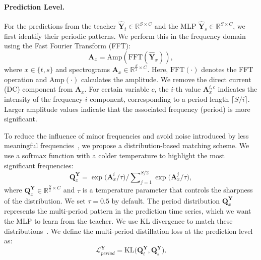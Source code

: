 \paragraph{Prediction Level.}
For the predictions from the teacher \(\mathbf{\hat{Y}}_t \in \mathbb{R}^{S \times C}\) and the MLP \(\mathbf{\hat{Y}}_s \in \mathbb{R}^{S \times C}\), we first identify their periodic patterns. We perform this in the frequency domain using the Fast Fourier Transform (FFT):
\begin{equation}
    \mathbf{A}_x = \text{Amp}(\text{FFT}(\mathbf{\hat{Y}}_x)),
    \label{eq:multiperiod_spectrograms}
\end{equation}
where \(x \in \{t, s\}\) and spectrograms \(\mathbf{A}_x \in \mathbb{R}^{\frac{S}{2} \times C}\). Here, \(\text{FFT}(\cdot)\) denotes the FFT operation and \(\text{Amp}(\cdot)\) calculates the amplitude. We remove the direct current (DC) component from \(\mathbf{A}_x\). For certain variable \(c\), the \(i\)-th value \(\mathbf{A}_x^{i,c}\) indicates the intensity of the frequency-\(i\) component, corresponding to a period length \(\lceil S/i\rceil\). Larger amplitude values indicate that the associated frequency (period) is more significant.

To reduce the influence of minor frequencies and avoid noise introduced by less meaningful frequencies~\cite{timesnet, fedformer}, we propose a distribution-based matching scheme. We use a softmax function with a colder temperature to highlight the most significant frequencies:
\begin{equation}
    \mathbf{Q}_x^\mathbf{Y} = {\exp\bigl(\mathbf{A}_x^i / \tau\bigr)}/{\sum\nolimits_{j=1}^{S/2} \exp\bigl(\mathbf{A}_x^j /\tau\bigr)},
    \label{eq:multiperiod_distribution}
\end{equation}
where \(\mathbf{Q}_x^\mathbf{Y} \in \mathbb{R}^{\frac{S}{2} \times C}\) and \(\tau\) is a temperature parameter that controls the sharpness of the distribution. We set \(\tau=0.5\) by default. The period distribution \(\mathbf{Q}_x^\mathbf{Y}\) represents the multi-period pattern in the prediction time series, which we want the MLP to learn from the teacher. We use KL divergence to match these distributions~\cite{hinton2015distilling}. We define the multi-period distillation loss at the prediction level as:
\begin{equation}
    \mathcal{L}_{period}^\mathbf{Y} = \text{KL}\bigl(\mathbf{Q}_t^\mathbf{Y}, \mathbf{Q}_s^\mathbf{Y}\bigr).
\end{equation}

